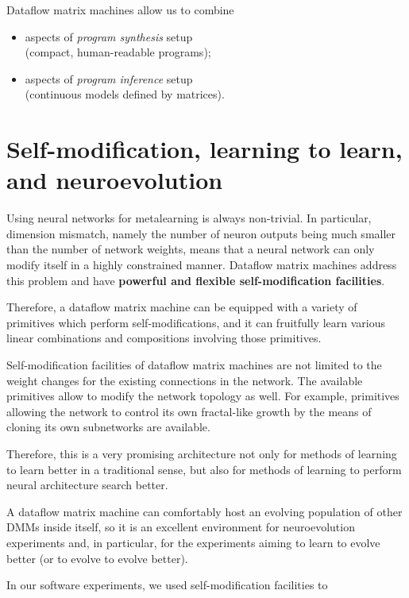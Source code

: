 \documentclass{article}
\begin{document}
\vspace{0.1in}
\noindent
Dataflow matrix machines allow us  to combine

  \begin{itemize}
      \item aspects of {\em program synthesis} setup\\ (compact, human-readable programs);
      \item aspects of {\em program inference} setup\\ (continuous models defined by matrices).
  \end{itemize}

\section{Self-modification, learning to learn, and neuroevolution} \label{sec:selfref}

Using neural networks for metalearning
is always non-trivial. In particular, dimension mismatch, namely the number of neuron outputs 
being much smaller than the number of network weights,
means that a neural network
can only modify itself in a highly constrained manner. Dataflow matrix machines address
this problem and have {\bf powerful and flexible self-modification facilities}.

Therefore, a dataflow matrix machine can be equipped with a variety of primitives
which perform self-modifications, and it can fruitfully learn various linear combinations and
compositions involving those primitives.

Self-modification facilities of dataflow matrix machines are not limited to the weight
changes for the existing connections in the network. The available primitives allow to
modify the network topology as well. For example, primitives allowing the network
to control its own fractal-like growth by the means of cloning its own subnetworks
are available.

Therefore, this is a very promising architecture not only for methods of learning to learn
better in a traditional sense, but also for methods of learning to perform
neural architecture search better. 

A dataflow matrix machine can comfortably host
an evolving population of other DMMs inside itself, so it is
an excellent environment for neuroevolution experiments and, in particular,
for the experiments aiming to learn to evolve better (or to evolve to evolve better).

\vspace{0.1in}
\noindent
In our software experiments, we used self-modification facilities to
\end{document}
